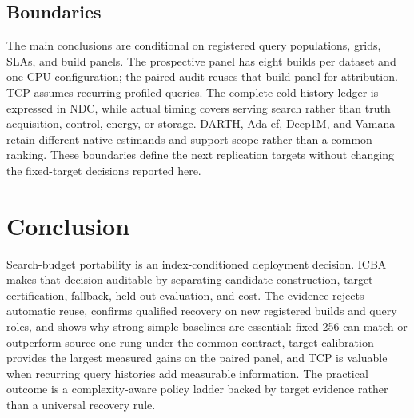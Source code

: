 \subsection{Boundaries}
The main conclusions are conditional on registered query populations, grids, SLAs, and build panels. The prospective panel has eight builds per dataset and one CPU configuration; the paired audit reuses that build panel for attribution. TCP assumes recurring profiled queries. The complete cold-history ledger is expressed in NDC, while actual timing covers serving search rather than truth acquisition, control, energy, or storage. DARTH, Ada-ef, Deep1M, and Vamana retain different native estimands and support scope rather than a common ranking. These boundaries define the next replication targets without changing the fixed-target decisions reported here.

\section{Conclusion}
Search-budget portability is an index-conditioned deployment decision. ICBA makes that decision auditable by separating candidate construction, target certification, fallback, held-out evaluation, and cost. The evidence rejects automatic reuse, confirms qualified recovery on new registered builds and query roles, and shows why strong simple baselines are essential: fixed-256 can match or outperform source one-rung under the common contract, target calibration provides the largest measured gains on the paired panel, and TCP is valuable when recurring query histories add measurable information. The practical outcome is a complexity-aware policy ladder backed by target evidence rather than a universal recovery rule.
